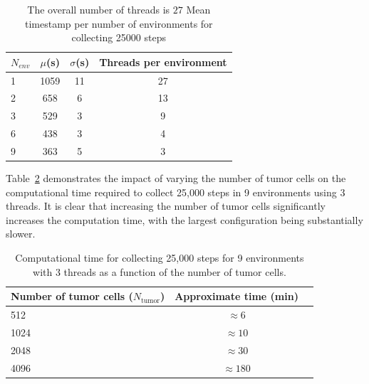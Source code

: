 \documentclass{article}
\begin{document}
\begin{table}[h!]
\centering
\caption{The overall number of threads is $27$ Mean timestamp per number of environments for collecting 25000 steps}
\label{tab:number_environments_means}
\begin{tabular}{lccc}
\hline
\textbf{$N_{env}$} &
\textbf{$\mu$(s)} &
\textbf{$\sigma$(s)} &
\textbf{Threads per environment} \\
\hline
1  & 1059 & 11 & 27 \\ 
2  & 658  & 6  & 13 \\ 
3  & 529  & 3  & 9 \\ 
6  & 438  & 3  & 4 \\ 
9  & 363  & 5  & 3 \\
\hline
\end{tabular}
\end{table}
Table~\ref{tab:number_cells_time} demonstrates the impact of varying the number of tumor cells on the computational time required to collect 25,000 steps in 9 environments using 3 threads. It is clear that increasing the number of tumor cells significantly increases the computation time, with the largest configuration being substantially slower.

\begin{table}[h!]
\centering
\caption{Computational time for collecting 25,000 steps for 9 environments with 3 threads as a function of the number of tumor cells.}
\label{tab:number_cells_time}
\begin{tabular}{lcc}
\hline
\textbf{Number of tumor cells ($N_\mathrm{tumor}$)} & 
\textbf{Approximate time (min)} \\
\hline
512   & $\approx 6$    \\
1024  & $\approx 10$   \\
2048  & $\approx 30$   \\
4096  & $\approx 180$  \\
\hline
\end{tabular}
\end{table}
\newpage
\end{document}
